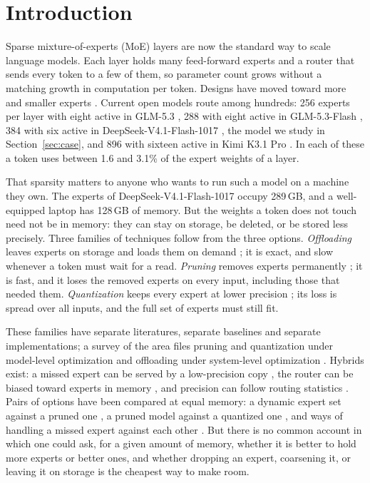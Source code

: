 \documentclass[11pt]{article}
\begin{document}
\section{Introduction}

Sparse mixture-of-experts (MoE) layers \citep{shazeer2017outrageously,fedus2021switch} are now
the standard way to scale language models. Each layer holds many feed-forward experts and a
router that sends every token to a few of them, so parameter count grows without a matching
growth in computation per token. Designs have moved toward more and smaller experts
\citep{dai2024deepseekmoe}. Current open models route among hundreds: 256 experts per
layer with eight active in GLM-5.3 \citep{zai2026glm53}, 288 with eight active in GLM-5.3-Flash
\citep{zai2026glm53flash}, 384 with six active in DeepSeek-V4.1-Flash-1017
\citep{deepseek2026v41flash}, the model we study in Section~\ref{sec:case}, and 896 with sixteen
active in Kimi K3.1 Pro \citep{moonshot2026kimik31}. In each of these a token uses between 1.6
and 3.1\% of the expert weights of a layer.

That sparsity matters to anyone who wants to run such a model on a machine they own. The experts of DeepSeek-V4.1-Flash-1017 occupy 289\,GB, and a well-equipped laptop has 128\,GB of memory. But the weights a token does not touch need not be in memory: they can stay on storage, be deleted, or be stored less precisely.
Three families of techniques follow from the three options. \emph{Offloading} leaves experts on
storage and loads them on demand
\citep{xue2024moeinfinity,fang2025fate,zhong2024adapmoe}; it is exact, and slow whenever a
token must wait for a read. \emph{Pruning} removes experts permanently \citep{lasby2025reap};
it is fast, and it loses the removed experts on every input, including those that needed them.
\emph{Quantization} keeps every expert at lower precision \citep{tseng2024quipsharp}; its loss
is spread over all inputs, and the full set of experts must still fit.

These families have separate literatures, separate baselines and separate implementations; a
survey of the area files pruning and quantization under model-level optimization and offloading
under system-level optimization \citep{liu2024survey}.
Hybrids exist: a missed expert can be served by a low-precision copy
\citep{tang2024hobbit,chu2025dynaexq}, the router can be biased toward experts in memory
\citep{skliar2024cache,zhu2025smoe}, and precision can follow routing statistics
\citep{wei2026matmoe,choi2025slicemoe}. Pairs of options have been compared at equal memory: a
dynamic expert set against a pruned one \citep{kong2023swapmoe,luo2026lightmoe}, a pruned model
against a quantized one \citep{jha2026half}, and ways of handling a missed expert against each
other \citep{hoang2026specmd,son2026misses}. But there is no common account in which one could ask,
for a given amount of memory, whether it is better to hold more experts or better ones, and
whether dropping an expert, coarsening it, or leaving it on storage is the cheapest way to make
room.
\end{document}
